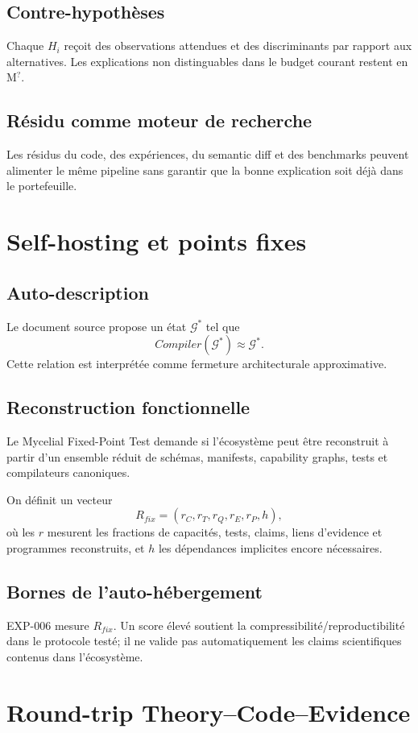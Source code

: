 \section{Contre-hypothèses}
Chaque $H_i$ reçoit des observations attendues et des discriminants par rapport aux alternatives. Les explications non distinguables dans le budget courant restent en M$^?$.

\section{Résidu comme moteur de recherche}
Les résidus du code, des expériences, du semantic diff et des benchmarks peuvent alimenter le même pipeline sans garantir que la bonne explication soit déjà dans le portefeuille.

\chapter{Self-hosting et points fixes}
\section{Auto-description}
Le document source propose un état $\mathcal G^*$ tel que
\[
Compiler(\mathcal G^*)\approx\mathcal G^*.
\]
Cette relation est interprétée comme fermeture architecturale approximative.

\section{Reconstruction fonctionnelle}
Le Mycelial Fixed-Point Test demande si l'écosystème peut être reconstruit à partir d'un ensemble réduit de schémas, manifests, capability graphs, tests et compilateurs canoniques.

On définit un vecteur
\[
R_{fix}=(r_C,r_T,r_Q,r_E,r_P,h),
\]
où les $r$ mesurent les fractions de capacités, tests, claims, liens d'evidence et programmes reconstruits, et $h$ les dépendances implicites encore nécessaires.

\section{Bornes de l'auto-hébergement}
EXP-006 mesure $R_{fix}$. Un score élevé soutient la compressibilité/reproductibilité dans le protocole testé; il ne valide pas automatiquement les claims scientifiques contenus dans l'écosystème.

\chapter{Round-trip Theory--Code--Evidence}
